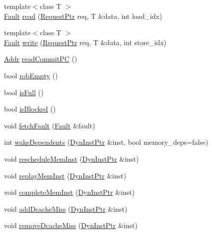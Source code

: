 \begin{DoxyCompactItemize}
\item 
{\footnotesize template$<$class T $>$ }\\\hyperlink{classRefCountingPtr}{Fault} \hyperlink{classLWBackEnd_a0747777ac998dabdc20fa0c554d378d3}{read} (\hyperlink{classRequest}{RequestPtr} req, T \&data, int load\_\-idx)
\item 
{\footnotesize template$<$class T $>$ }\\\hyperlink{classRefCountingPtr}{Fault} \hyperlink{classLWBackEnd_abbf7bcc93511421a1787650a43e2642a}{write} (\hyperlink{classRequest}{RequestPtr} req, T \&data, int store\_\-idx)
\item 
\hyperlink{base_2types_8hh_af1bb03d6a4ee096394a6749f0a169232}{Addr} \hyperlink{classLWBackEnd_aa28f3fe58fde4b038a92b9f87a40cb10}{readCommitPC} ()
\item 
bool \hyperlink{classLWBackEnd_a5c38df1621043861ada4dd0939509869}{robEmpty} ()
\item 
bool \hyperlink{classLWBackEnd_a3e70330939fdfc4dbc2f60c1a660584d}{isFull} ()
\item 
bool \hyperlink{classLWBackEnd_ae6ec007d68382eb124ed25bc90ae9c17}{isBlocked} ()
\item 
void \hyperlink{classLWBackEnd_a71dcc69e5b01fa12b8ccd2dccdcc9917}{fetchFault} (\hyperlink{classRefCountingPtr}{Fault} \&fault)
\item 
int \hyperlink{classLWBackEnd_a044f74c5b9426d9738e2d015395a3e72}{wakeDependents} (\hyperlink{classLWBackEnd_a028ce10889c5f6450239d9e9a7347976}{DynInstPtr} \&inst, bool memory\_\-deps=false)
\item 
void \hyperlink{classLWBackEnd_aa9c46f45f491ef90a936c7e2b95f20aa}{rescheduleMemInst} (\hyperlink{classLWBackEnd_a028ce10889c5f6450239d9e9a7347976}{DynInstPtr} \&inst)
\item 
void \hyperlink{classLWBackEnd_ae165df775b4de9e9430228c7f04c2bc9}{replayMemInst} (\hyperlink{classLWBackEnd_a028ce10889c5f6450239d9e9a7347976}{DynInstPtr} \&inst)
\item 
void \hyperlink{classLWBackEnd_a2212f511dc1886c073cf7ff1665f5c87}{completeMemInst} (\hyperlink{classLWBackEnd_a028ce10889c5f6450239d9e9a7347976}{DynInstPtr} \&inst)
\item 
void \hyperlink{classLWBackEnd_a1a46c3adb06eeecca716b3cffb054d84}{addDcacheMiss} (\hyperlink{classLWBackEnd_a028ce10889c5f6450239d9e9a7347976}{DynInstPtr} \&inst)
\item 
void \hyperlink{classLWBackEnd_a3eec16e4a583e6312ba14ffe5a004296}{removeDcacheMiss} (\hyperlink{classLWBackEnd_a028ce10889c5f6450239d9e9a7347976}{DynInstPtr} \&inst)

\end{DoxyCompactItemize}
